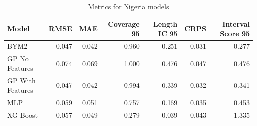 \begin{table}
\caption{Metrics for Nigeria models}
\label{nga-tab-models}
\begin{tabular}{lrrrrrr}
\toprule
Model & RMSE & MAE & Coverage 95 & Length IC 95 & CRPS & Interval Score 95 \\
\midrule
BYM2 & 0.047 & 0.042 & 0.960 & 0.251 & 0.031 & 0.277 \\
GP No Features & 0.074 & 0.069 & 1.000 & 0.476 & 0.047 & 0.476 \\
GP With Features & 0.047 & 0.042 & 0.994 & 0.339 & 0.032 & 0.341 \\
MLP & 0.059 & 0.051 & 0.757 & 0.169 & 0.035 & 0.453 \\
XG-Boost & 0.057 & 0.049 & 0.279 & 0.039 & 0.043 & 1.335 \\
\bottomrule
\end{tabular}
\end{table}

